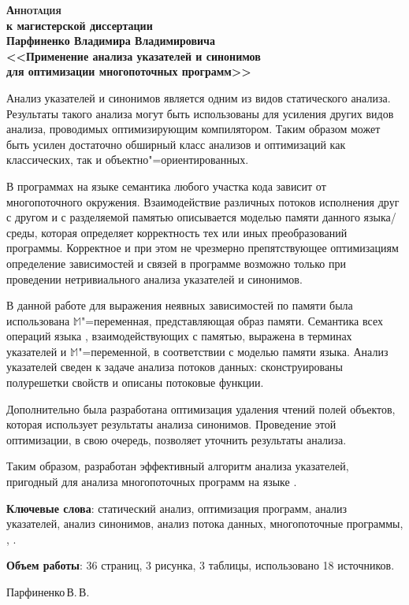 \documentclass[12pt]{article}
\begin{document}
  \thispagestyle{empty}

  \begin{center}
    \bfseries
    {\Large \scshape Аннотация}\\
    к магистерской диссертации\\
    Парфиненко Владимира Владимировича\\
    {\large
      <<Применение анализа указателей и синонимов\\
      для оптимизации многопоточных программ>>\\
    }
  \end{center}

  Анализ указателей и синонимов является одним из видов статического анализа.
  Результаты такого анализа могут быть использованы для усиления других видов
  анализа, проводимых оптимизирующим компилятором.
  Таким образом может быть усилен достаточно обширный класс анализов и
  оптимизаций как классических, так и объектно"=ориентированных.

  В программах на языке  семантика любого участка кода зависит от
  многопоточного окружения.
  Взаимодействие различных потоков исполнения друг с другом и с разделяемой
  памятью описывается моделью памяти данного языка\slash{}среды, которая
  определяет корректность тех или иных преобразований программы.
  Корректное и при этом не чрезмерно препятствующее оптимизациям определение
  зависимостей и связей в программе возможно только при проведении
  нетривиального анализа указателей и синонимов.

  В данной работе для выражения неявных зависимостей по памяти была
  использована $\mathbb{M}$"=переменная, представляющая образ памяти.
  Семантика всех операций языка , взаимодействующих с памятью,
  выражена в терминах указателей и $\mathbb{M}$"=переменной, в соответствии с
  моделью памяти языка.
  Анализ указателей сведен к задаче анализа потоков данных: сконструированы
  полурешетки свойств и описаны потоковые функции.

  Дополнительно была разработана оптимизация удаления чтений полей объектов,
  которая использует результаты анализа синонимов.
  Проведение этой оптимизации, в свою очередь, позволяет уточнить результаты
  анализа.

  Таким образом, разработан эффективный алгоритм анализа указателей, пригодный
  для анализа многопоточных программ на языке .

  \vspace{0.5cm}

  \textbf{Ключевые слова}: статический анализ, оптимизация программ, анализ
  указателей, анализ синонимов, анализ потока данных, многопоточные программы,
  , .

  \textbf{Объем работы}: 36 страниц, 3 рисунка, 3 таблицы, использовано 18
  источников.

  \begin{flushright}
    Парфиненко\,В.\,В.
  \end{flushright}
\end{document}
